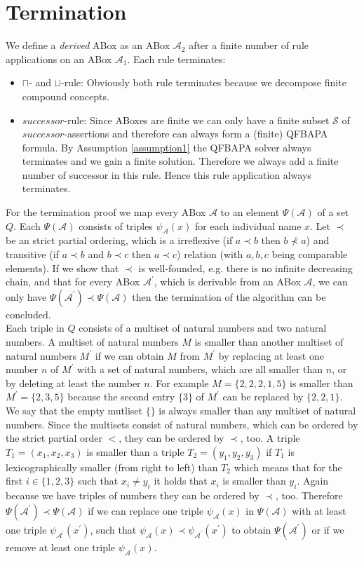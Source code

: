 \documentclass{book}
\theoremstyle{break}
\theoremstyle{definition}
\begin{document}
\section{Termination}
We define a \textit{derived} ABox as an ABox $\mathcal{A}_2$ after a finite number of rule applications on an ABox $\mathcal{A}_1$. Each rule terminates:
\begin{itemize}
\item $\sqcap$- and $\sqcup$-rule: Obviously both rule terminates because we decompose finite compound concepts.
\item $successor$-rule: Since ABoxes are finite we can only have a finite subset $\mathcal{S}$ of $successor$-assertions and therefore can always form a (finite) QFBAPA formula. By Assumption \ref{assumption1}  the QFBAPA solver always terminates and we gain a finite solution. Therefore we always add a finite number of successor in this rule. Hence this rule application always terminates.
\end{itemize}
For the termination proof we map every ABox $\mathcal{A}$ to an element $\Psi(\mathcal{A})$ of a set $Q$. Each $\Psi(\mathcal{A})$ consists of triples $\psi_\mathcal{A}(x)$ for each individual name $x$. Let $\prec$ be an strict partial ordering, which is a irreflexive (if $a\prec b$ then $b\not\prec a$) and transitive (if $a\prec b$ and $b\prec c$ then $a\prec c$) relation (with $a,b,c$ being comparable elements). If we show that $\prec$ is well-founded, e.g. there is no infinite decreasing chain, and that for every ABox $\mathcal{A}^\prime$, which is derivable from an ABox $\mathcal{A}$, we can only have $\Psi(\mathcal{A}^\prime)\prec\Psi(\mathcal{A})$ then the termination of the algorithm can be concluded.\\
Each triple in $Q$ consists of a multiset of natural numbers and two natural numbers. A multiset of natural numbers $M$ is smaller than another multiset of natural numbers $M^\prime$ if we can obtain $M$ from $M^\prime$ by replacing at least one number $n$ of $M^\prime$ with a set of natural numbers, which are all smaller than $n$, or by deleting at least the number $n$. For example $M=\{2,2,2,1,5\}$ is smaller than $M^\prime=\{2,3,5\}$ because the second entry $\{3\}$ of $M^\prime$ can be replaced by $\{2,2,1\}$. We say that the empty mutliset $\{\}$ is always smaller than any multiset of natural numbers. Since the multisets consist of natural numbers, which can be ordered by the strict partial order $<$, they can be ordered by $\prec$, too. A triple $T_1=(x_1,x_2, x_3)$ is smaller than a triple $T_2=(y_1,y_2,y_3)$ if $T_1$ is lexicographically smaller (from right to left) than $T_2$ which means that for the first $i\in\{1,2,3\}$ such that $x_i\neq y_i$ it holds that $x_i$ is smaller than $y_i$. Again because we have triples of numbers they can be ordered by $\prec$, too. Therefore $\Psi(\mathcal{A}^\prime)\prec\Psi(\mathcal{A})$ if we can replace one triple $\psi_\mathcal{A}(x)$ in $\Psi(\mathcal{A})$ with at least one triple $\psi_{\mathcal{A}^\prime}(x^\prime)$, such that $\psi_\mathcal{A}(x)\prec\psi_{\mathcal{A}^\prime}(x^\prime)$ to obtain $\Psi(\mathcal{A}^\prime)$ or if we remove at least one triple $\psi_\mathcal{A}(x)$.\\
\end{document}
